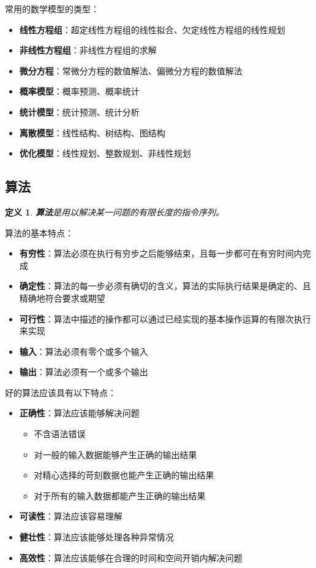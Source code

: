 \documentclass[10pt, a4paper, oneside, fontset=none]{ctexart}
\theoremstyle{plain}
\newtheorem{definition}{定义}[section]
\theoremstyle{definition}
\newcommand{\tboba}[1]{\textbf{\kai\color{bali!75!black}#1}}
\begin{document}
常用的数学模型的类型：
\begin{itemize}
    \item \tboba{线性方程组}：超定线性方程组的线性拟合、欠定线性方程组的线性规划
    \item \tboba{非线性方程组}：非线性方程组的求解
    \item \tboba{微分方程}：常微分方程的数值解法、偏微分方程的数值解法
    \item \tboba{概率模型}：概率预测、概率统计
    \item \tboba{统计模型}：统计预测、统计分析
    \item \tboba{离散模型}：线性结构、树结构、图结构
    \item \tboba{优化模型}：线性规划、整数规划、非线性规划
\end{itemize}

\subsection{算法}

\begin{definition}
    \tboba{算法}是用以解决某一问题的有限长度的指令序列。
\end{definition}

算法的基本特点：
\begin{itemize}
    \item \tboba{有穷性}：算法必须在执行有穷步之后能够结束，且每一步都可在有穷时间内完成
    \item \tboba{确定性}：算法的每一步必须有确切的含义，算法的实际执行结果是确定的、且精确地符合要求或期望
    \item \tboba{可行性}：算法中描述的操作都可以通过已经实现的基本操作运算的有限次执行来实现
    \item \tboba{输入}：算法必须有零个或多个输入
    \item \tboba{输出}：算法必须有一个或多个输出
\end{itemize}

好的算法应该具有以下特点：
\begin{itemize}
    \item \tboba{正确性}：算法应该能够解决问题
    \begin{itemize}
        \item 不含语法错误
        \item 对一般的输入数据能够产生正确的输出结果
        \item 对精心选择的苛刻数据也能产生正确的输出结果
        \item 对于所有的输入数据都能产生正确的输出结果
    \end{itemize}
    \item \tboba{可读性}：算法应该容易理解
    \item \tboba{健壮性}：算法应该能够处理各种异常情况
    \item \tboba{高效性}：算法应该能够在合理的时间和空间开销内解决问题
\end{itemize}
\end{document}
